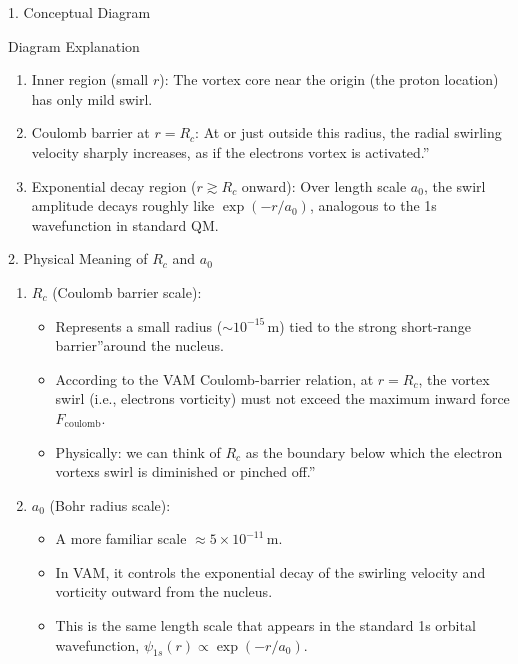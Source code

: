 1. Conceptual Diagram

Diagram Explanation

\begin{enumerate}
    \item Inner region (small \(r\)): The vortex core near the origin (the proton location) has only mild swirl.
    \item Coulomb barrier at \(r = R_c\): At or just outside this radius, the radial swirling velocity sharply increases, as if the electron\rqs s vortex is \grqq activated.\textquotedblright
    \item Exponential decay region (\(r \gtrsim R_c\) onward): Over length scale \(a_0\), the swirl amplitude decays roughly like \(\exp(-r/a_0)\), analogous to the 1s wavefunction in standard QM.
\end{enumerate}

2. Physical Meaning of \(R_c\) and \(a_0\)

\begin{enumerate}
\item \(R_c\) (Coulomb barrier scale):

    \begin{itemize}
    \item Represents a small radius (\(\sim 10^{-15}\,\mathrm{m}\)) tied to the strong short‐range \grqq barrier\textquotedblright around the nucleus.
    \item According to the VAM Coulomb‐barrier relation, at \(r = R_c\), the vortex swirl (i.e., electron\rqs s vorticity) must not exceed the maximum inward force \(F_{\mathrm{coulomb}}\).
    \item Physically: we can think of \(R_c\) as the boundary below which the electron vortex\rqs s swirl is diminished or \grqq pinched off.\textquotedblright
    \end{itemize}

\item \(a_0\) (Bohr radius scale):

    \begin{itemize}
    \item A more familiar scale \(\approx 5 \times 10^{-11}\,\mathrm{m}\).
    \item In VAM, it controls the exponential decay of the swirling velocity and vorticity outward from the nucleus.
    \item This is the same length scale that appears in the standard 1s orbital wavefunction, \(\psi_{1s}(r) \propto \exp(-r/a_0)\).
    \end{itemize}
\end{enumerate}

